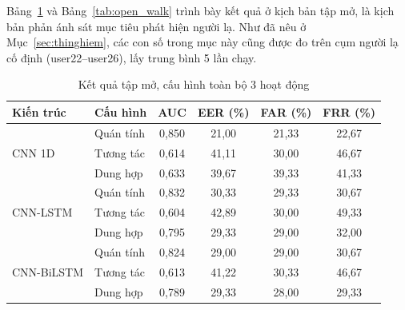 \documentclass[../DoAn.tex]{subfiles}
\begin{document}
Bảng~\ref{tab:open_all} và Bảng~\ref{tab:open_walk} trình bày kết quả ở kịch bản tập mở, là kịch bản phản ánh sát mục tiêu phát hiện người lạ. Như đã nêu ở Mục~\ref{sec:thinghiem}, các con số trong mục này cũng được đo trên cụm người lạ cố định (user22--user26), lấy trung bình 5 lần chạy.

\begin{table}[H]
    \centering
    \caption{Kết quả tập mở, cấu hình toàn bộ 3 hoạt động}
    \label{tab:open_all}
    \begin{tabular}{|l|l|c|c|c|c|}
    \hline
    \textbf{Kiến trúc} & \textbf{Cấu hình} & \textbf{AUC} & \textbf{EER (\%)} & \textbf{FAR (\%)} & \textbf{FRR (\%)} \\
    \hline
    \multirow{3}{*}{CNN 1D}     & Quán tính & 0,850 & 21,00 & 21,33 & 22,67 \\
                                & Tương tác & 0,614 & 41,11 & 30,00 & 46,67 \\
                                & Dung hợp  & 0,633 & 39,67 & 39,33 & 41,33 \\
    \hline
    \multirow{3}{*}{CNN-LSTM}   & Quán tính & 0,832 & 30,33 & 29,33 & 30,67 \\
                                & Tương tác & 0,604 & 42,89 & 30,00 & 49,33 \\
                                & Dung hợp  & 0,795 & 29,33 & 29,00 & 32,00 \\
    \hline
    \multirow{3}{*}{CNN-BiLSTM} & Quán tính & 0,824 & 29,00 & 29,00 & 30,67 \\
                                & Tương tác & 0,613 & 41,22 & 30,33 & 46,67 \\
                                & Dung hợp  & 0,789 & 29,33 & 28,00 & 29,33 \\
    \hline
    \end{tabular}
\end{table}
\end{document}
